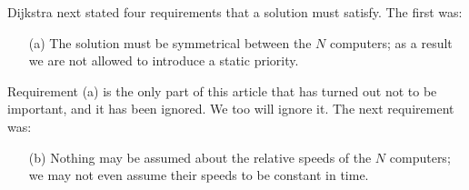 \documentclass[fleqn,leqno]{article}
\begin{document}
Dijkstra next stated four requirements that a solution must satisfy.
The first was:
%
\begin{itemize}
\item[(a)] The solution must be symmetrical between the $N$ computers;
as a result we are not allowed to introduce a static priority.
\end{itemize}
%
%
% 
% 
% 
% 
%
Requirement (a) is the only part of this article that has turned out
not to be important, and it has been ignored.  We too will ignore it.
The next requirement was:
\begin{itemize}
\item[(b)] Nothing may be assumed about the relative speeds of the $N$
computers; we may not even assume their speeds to be constant in time.
\end{itemize}
\end{document}
